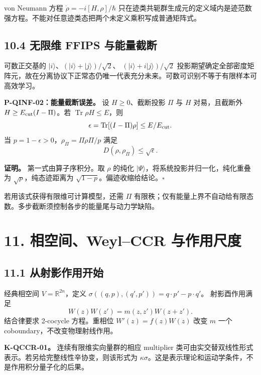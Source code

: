 \documentclass[
  11pt,
  oneside]{book}
\begin{document}
von Neumann 方程 \(\dot\rho=-i[H,\rho]/\hbar\)
只在迹类共轭群生成元的定义域内是迹范数强方程。不能对任意迹类态把两个未定义乘积写成普通矩阵式。

\hypertarget{ux65e0ux9650ux7ef4-ffips-ux4e0eux80fdux91cfux622aux65ad}{%
\section{10.4 无限维 FFIPS
与能量截断}\label{ux65e0ux9650ux7ef4-ffips-ux4e0eux80fdux91cfux622aux65ad}}

可数正交基的 \(|i\rangle\)、\((|i\rangle+|j\rangle)/\sqrt2\)、
\((|i\rangle+i|j\rangle)/\sqrt2\)
投影期望确定全部密度矩阵元，故在分离协议下正常态仍唯一代表充分未来。可数可识别不等于有限样本可高效学习。

\protect\hypertarget{p-qinf-02}{}{}

\textbf{P-QINF-02：能量截断误差。} 设 \(H\ge0\)、截断投影 \(\Pi\) 与
\(H\) 对易，且截断外 \(H\ge E_{\rm cut}(I-\Pi)\)。若
\(\operatorname{Tr}\rho H\le E\)，则 \[
\epsilon=\operatorname{Tr}[(I-\Pi)\rho]\le E/E_{\rm cut}.
\] 当 \(p=1-\epsilon>0\)，\(\rho_\Pi=\Pi\rho\Pi/p\) 满足 \[
D(\rho,\rho_\Pi)\le\sqrt{\epsilon}.
\]

\textbf{证明。} 第一式由算子序积分。取 \(\rho\) 的纯化
\(|\Psi\rangle\)，将系统投影并归一化，纯化重叠为
\(\sqrt p\)，纯态迹距离为 \(\sqrt{1-p}\)。偏迹收缩给结论。\(\square\)

若用该式获得有限维可计算模型，还需 \(\Pi\)
有限秩；仅有能量上界不自动给有限态数。多步截断须控制各步的能量尾与动力学缺陷。

\hypertarget{ch-11}{%
\chapter{11. 相空间、Weyl--CCR 与作用尺度}\label{ch-11}}

\hypertarget{ux4eceux5c04ux5f71ux4f5cux7528ux5f00ux59cb}{%
\section{11.1
从射影作用开始}\label{ux4eceux5c04ux5f71ux4f5cux7528ux5f00ux59cb}}

经典相空间 \(V=\mathbb R^{2n}\)，定义
\(\sigma((q,p),(q',p'))=q\cdot p'-p\cdot q'\)。 射影酉作用满足 \[
W(z)W(z')=m(z,z')W(z+z').
\] 结合律要求 2-cocycle 方程。重相位 \(W'(z)=f(z)W(z)\) 改变 \(m\) 一个
coboundary，不改变物理射线作用。

\textbf{K-QCCR-01。} 连续有限维实向量群的相应 multiplier
类可由实交替双线性形式表示。若另给完整线性辛协变，则该形式为
\(\kappa\sigma\)。这是表示理论和运动学条件，不是作用积分量子化的后果。
\end{document}
